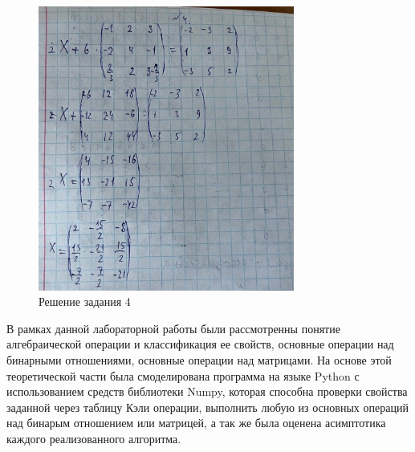 \documentclass[spec, och, labwork]{shiza}
\begin{document}
\begin{figure}[H]
    \centering      %
    \includegraphics[width=0.75\textwidth]{17}
    \caption{Решение задания 4}
    \label{fig:image1}
\end{figure}

\newpage
\conclusion

В рамках данной лабораторной работы были рассмотренны понятие алгебраической операции и классификация ее свойств, основные операции над бинарными отношениями,
основные операции над матрицами. На основе этой теоретической части была смоделирована программа на языке Python с 
использованием средств библиотеки Numpy, которая способна проверки свойства заданной через таблицу Кэли операции, выполнить любую из основных операций над бинарым отношением
или матрицей, а так же была оценена асимптотика каждого реализованного алгоритма.
\end{document}
